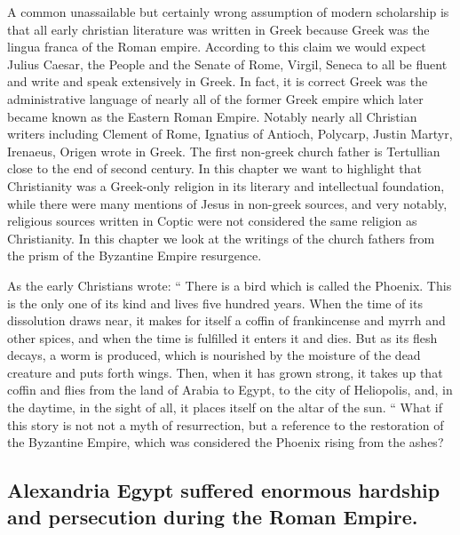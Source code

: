 A common unassailable but certainly wrong assumption of modern scholarship is that all early christian literature was written in Greek because Greek was the lingua franca of the Roman empire.
According to this claim we would expect Julius Caesar, the People and the Senate of Rome, Virgil, Seneca to all be fluent and write and speak extensively in Greek.
In fact, it is correct Greek was the administrative language of nearly all of the former Greek empire which later became known as the Eastern Roman Empire.
Notably nearly all Christian writers including Clement of Rome, Ignatius of Antioch, Polycarp, Justin Martyr, Irenaeus, Origen wrote in Greek.
The first non-greek church father is Tertullian close to the end of second century.
In this chapter we want to highlight that Christianity was a Greek-only religion in its literary and intellectual foundation, while there were many mentions of Jesus in non-greek sources, and very notably, religious sources written in Coptic were not considered the same religion as Christianity.
In this chapter we look at the writings of the church fathers from the prism of the Byzantine Empire resurgence.

As the early Christians wrote:
``
There is a bird which is called the Phoenix.
This is the only one of its kind and lives five hundred years.
When the time of its dissolution draws near, it makes for itself a coffin of frankincense and myrrh and other spices, and when the time is fulfilled it enters it and dies.
But as its flesh decays, a worm is produced, which is nourished by the moisture of the dead creature and puts forth wings.
Then, when it has grown strong, it takes up that coffin and flies from the land of Arabia to Egypt, to the city of Heliopolis, and, in the daytime, in the sight of all, it places itself on the altar of the sun.
``
What if this story is not not a myth of resurrection, but a reference to the restoration of the Byzantine Empire, which was considered the Phoenix rising from the ashes?

\subsection{Alexandria Egypt suffered enormous hardship and persecution during the Roman Empire.}\label{par:alexandria-egypt-suffered-enormous-hardship-and-persecution-during-the-roman-empire.}

